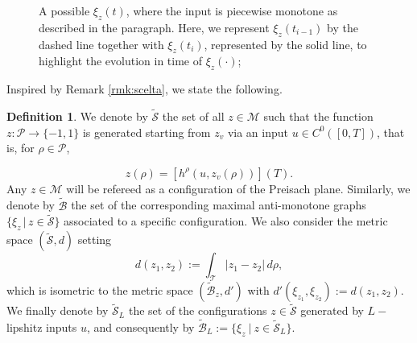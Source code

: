\documentclass[12pt]{article}
\newcommand{\M}{\mathcal{M}}
\newcommand{\T}{\mathcal{T}}
\newcommand{\p}{\rho}
\newcommand{\1}{\mathds{1}}
\theoremstyle{definition}
\newtheorem{defi}[teo]{Definition}
\begin{document}
\begin{figure}[H]
    \caption{A possible $\xi_z(t)$, where the input is piecewise monotone as described in the paragraph. Here, we represent $\xi_z(t_{i-1})$ by the dashed line together with $\xi_z(t_{i})$, represented by the solid line, to highlight the evolution in time of $\xi_z(\cdot)$;}
    \label{fig: prei2}
\end{figure}


Inspired by Remark \ref{rmk:scelta}, we state the following.

\begin{defi}
    \label{def:S} We denote by $\tilde{\mathcal S}$ the set of all $z\in \M$ such that the function $z:{\mathcal P}\to\{-1,1\}$ is generated starting from $z_v$ via an input $u\in C^0([0,T])$, that is, for $\rho\in{\mathcal P}$,

\[
z(\rho)=[h^\rho(u,z_v(\p))](T).
\] 
Any $z\in \M$ will be refereed as a configuration of the Preisach plane. Similarly, we denote by $\tilde{\mathcal B}$ the set of the corresponding maximal anti-monotone graphs $\{ \xi_z \,|\, z\in \tilde{\mathcal S}\}$ associated to a specific configuration. We also consider the metric space $(\tilde{\mathcal S}, d)$ setting \[d(z_1,z_2):= \int_\T |z_1-z_2| \, d\p,\] which is isometric to the metric space $(\tilde{\mathcal B}_z, d')$ with $d'(\xi_{z_1}, \xi_{z_2}):=d(z_1,z_2).$ We finally denote by $\tilde{\mathcal S}_L$ the set of the configurations $z\in\tilde{\mathcal S}$ generated by $L-$lipshitz inputs $u$, and consequently by $\tilde{\mathcal B}_L:=\{\xi_z ~|~ z \in \tilde{\mathcal S}_L\}.$
\end{defi}
\end{document}
